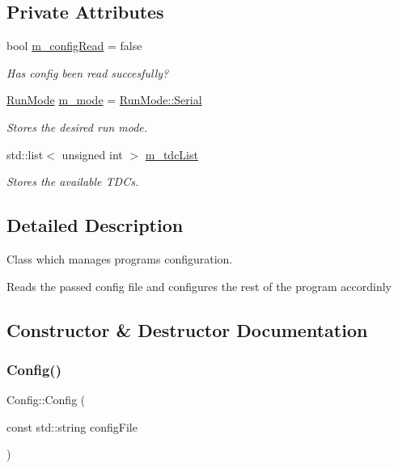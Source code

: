 \subsection*{Private Attributes}
\begin{DoxyCompactItemize}
\item 
bool \hyperlink{class_config_a82bcc998ae058699369aee4a189f0ad1}{m\+\_\+config\+Read} = false
\begin{DoxyCompactList}\small\item\em Has config been read succesfully? \end{DoxyCompactList}\item 
\hyperlink{_modes_enum_8hpp_a3dfe11cf1a3a8121f6cd7fec4bf5947e}{Run\+Mode} \hyperlink{class_config_a65b1f233533ce1e2acd85f6a4a07c4d4}{m\+\_\+mode} = \hyperlink{_modes_enum_8hpp_a3dfe11cf1a3a8121f6cd7fec4bf5947eaab27270f353006b03c91367e05e44b94}{Run\+Mode\+::\+Serial}
\begin{DoxyCompactList}\small\item\em Stores the desired run mode. \end{DoxyCompactList}\item 
std\+::list$<$ unsigned int $>$ \hyperlink{class_config_ac7295451d604cec09ed31ca74411c68c}{m\+\_\+tdc\+List}
\begin{DoxyCompactList}\small\item\em Stores the available T\+D\+Cs. \end{DoxyCompactList}\end{DoxyCompactItemize}


\subsection{Detailed Description}
Class which manages programs configuration. 

Reads the passed config file and configures the rest of the program accordinly 

\subsection{Constructor \& Destructor Documentation}
\mbox{\label{class_config_af8b0e9dc72b16b73ebb32d177fb93e1b}} 
\subsubsection{\texorpdfstring{Config()}{Config()}}
{\footnotesize\ttfamily Config\+::\+Config (\begin{DoxyParamCaption}\item[{const std\+::string}]{config\+File }\end{DoxyParamCaption})}



